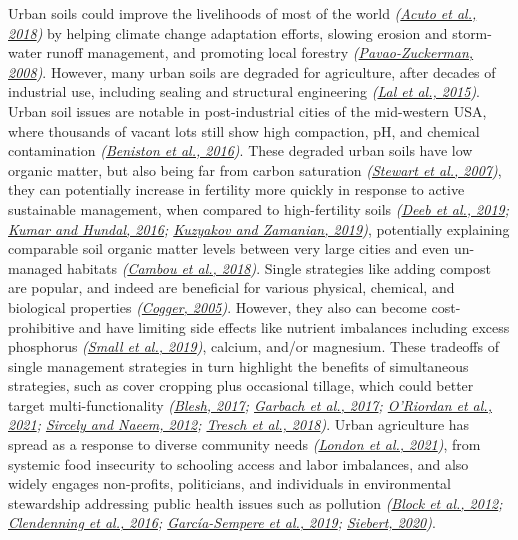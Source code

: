 \documentclass[
  12pt,
]{article}
\begin{document}
Urban soils could improve the livelihoods of most of the world \emph{(\protect\hyperlink{ref-acuto18}{Acuto et al., 2018})} by helping climate change adaptation efforts, slowing erosion and storm-water runoff management, and promoting local forestry \emph{(\protect\hyperlink{ref-pavao-zuckerman08}{Pavao-Zuckerman, 2008})}.
However, many urban soils are degraded for agriculture, after decades of industrial use, including sealing and structural engineering \emph{(\protect\hyperlink{ref-lal15}{Lal et al., 2015})}.
Urban soil issues are notable in post-industrial cities of the mid-western USA, where thousands of vacant lots still show high compaction, pH, and chemical contamination \emph{(\protect\hyperlink{ref-beniston16}{Beniston et al., 2016})}.
These degraded urban soils have low organic matter, but also being far from carbon saturation \emph{(\protect\hyperlink{ref-stewart07}{Stewart et al., 2007})}, they can potentially increase in fertility more quickly in response to active sustainable management, when compared to high-fertility soils \emph{(\protect\hyperlink{ref-deeb19}{Deeb et al., 2019}; \protect\hyperlink{ref-kumar16}{Kumar and Hundal, 2016}; \protect\hyperlink{ref-kuzyakov19}{Kuzyakov and Zamanian, 2019})}, potentially explaining comparable soil organic matter levels between very large cities and even un-managed habitats \emph{(\protect\hyperlink{ref-cambou18}{Cambou et al., 2018})}.
Single strategies like adding compost are popular, and indeed are beneficial for various physical, chemical, and biological properties \emph{(\protect\hyperlink{ref-cogger05}{Cogger, 2005})}.
However, they also can become cost-prohibitive and have limiting side effects like nutrient imbalances including excess phosphorus \emph{(\protect\hyperlink{ref-small19}{Small et al., 2019})}, calcium, and/or magnesium.
These tradeoffs of single management strategies in turn highlight the benefits of simultaneous strategies, such as cover cropping plus occasional tillage, which could better target multi-functionality \emph{(\protect\hyperlink{ref-blesh17}{Blesh, 2017}; \protect\hyperlink{ref-garbach17}{Garbach et al., 2017}; \protect\hyperlink{ref-oriordan21}{O'Riordan et al., 2021}; \protect\hyperlink{ref-sircely12}{Sircely and Naeem, 2012}; \protect\hyperlink{ref-tresch18}{Tresch et al., 2018})}.
Urban agriculture has spread as a response to diverse community needs \emph{(\protect\hyperlink{ref-london21}{London et al., 2021})}, from systemic food insecurity to schooling access and labor imbalances, and also widely engages non-profits, politicians, and individuals in environmental stewardship addressing public health issues such as pollution \emph{(\protect\hyperlink{ref-block12}{Block et al., 2012}; \protect\hyperlink{ref-clendenning16}{Clendenning et al., 2016}; \protect\hyperlink{ref-garcia-sempere19}{García-Sempere et al., 2019}; \protect\hyperlink{ref-siebert20}{Siebert, 2020})}.
\end{document}
